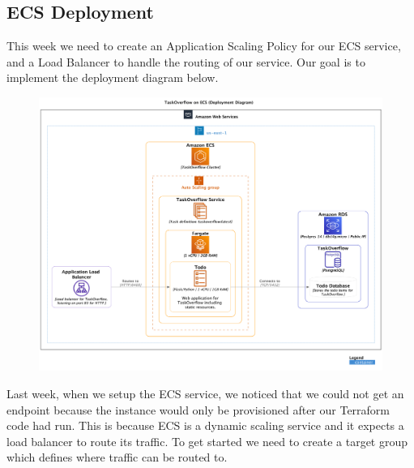 \documentclass{csse4400}
\begin{document}

\subsection{ECS Deployment}
\label{pathb}

This week we need to create an Application Scaling Policy for our ECS service,
and a Load Balancer to handle the routing of our service.
Our goal is to implement the deployment diagram below.

\begin{figure}[H]
  \includegraphics[trim=0 230 0 0,clip,width=\textwidth]{diagrams/ecsdeployment}
\end{figure}

Last week, when we setup the ECS service, we noticed that we could not get an endpoint because the instance would only be provisioned after our Terraform code had run.
This is because ECS is a dynamic scaling service and it expects a load balancer to route its traffic.
To get started we need to create a target group which defines where traffic can be routed to.
\end{document}
